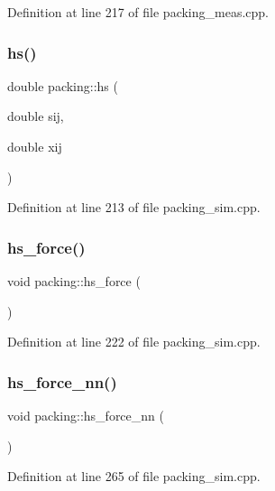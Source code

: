 Definition at line 217 of file packing\+\_\+meas.\+cpp.

\mbox{\label{classpacking_a87346c3bda1750e3a75fcb626ccaf82f}} 
\subsubsection{\texorpdfstring{hs()}{hs()}}
{\footnotesize\ttfamily double packing\+::hs (\begin{DoxyParamCaption}\item[{double}]{sij,  }\item[{double}]{xij }\end{DoxyParamCaption})}



Definition at line 213 of file packing\+\_\+sim.\+cpp.

\mbox{\label{classpacking_a2506d13784217eda51bcb99b6005c94d}} 
\subsubsection{\texorpdfstring{hs\+\_\+force()}{hs\_force()}}
{\footnotesize\ttfamily void packing\+::hs\+\_\+force (\begin{DoxyParamCaption}{ }\end{DoxyParamCaption})}



Definition at line 222 of file packing\+\_\+sim.\+cpp.

\mbox{\label{classpacking_aee29c91dd4747aca62cfecfb5197f87a}} 
\subsubsection{\texorpdfstring{hs\+\_\+force\+\_\+nn()}{hs\_force\_nn()}}
{\footnotesize\ttfamily void packing\+::hs\+\_\+force\+\_\+nn (\begin{DoxyParamCaption}{ }\end{DoxyParamCaption})}



Definition at line 265 of file packing\+\_\+sim.\+cpp.

